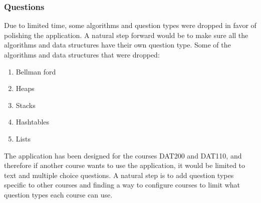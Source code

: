 \subsubsection{Questions}
Due to limited time, some algorithms and question types were dropped in favor of polishing the application. A natural step forward would be to make sure all the algorithms and data structures have their own question type. Some of the algorithms and data structures that were dropped: 
\begin{enumerate}
	\item Bellman ford
	\item Heaps
	\item Stacks
	\item Hashtables
	\item Lists
\end{enumerate}
The application has been designed for the courses DAT200 and DAT110, and therefore if another course wants to use the application, it would be limited to text and multiple choice questions. A natural step is to add question types specific to other courses and finding a way to configure courses to limit what question types each course can use.